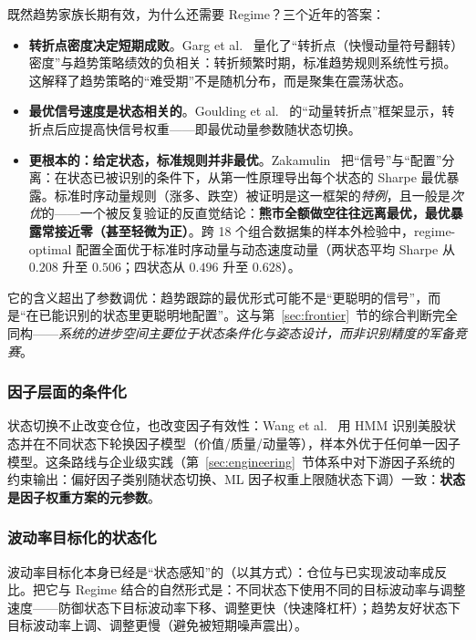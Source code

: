 既然趋势家族长期有效，为什么还需要 Regime？三个近年的答案：

\begin{itemize}[itemsep=2pt]
\item \textbf{转折点密度决定短期成败}。Garg et al.~\cite{garg2024} 量化了“转折点（快慢动量符号翻转）密度”与趋势策略绩效的负相关：转折频繁时期，标准趋势规则系统性亏损。这解释了趋势策略的“难受期”不是随机分布，而是聚集在震荡状态。
\item \textbf{最优信号速度是状态相关的}。Goulding et al.~\cite{goulding2023} 的“动量转折点”框架显示，转折点后应提高快信号权重——即最优动量参数随状态切换。
\item \textbf{更根本的：给定状态，标准规则并非最优}。Zakamulin~\cite{zakamulin2026} 把“信号”与“配置”分离：在状态已被识别的条件下，从第一性原理导出每个状态的 Sharpe 最优暴露。标准时序动量规则（涨多、跌空）被证明是这一框架的\emph{特例}，且一般是\emph{次优}的——一个被反复验证的反直觉结论：\textbf{熊市全额做空往往远离最优，最优暴露常接近零（甚至轻微为正）}。跨 18 个组合数据集的样本外检验中，regime-optimal 配置全面优于标准时序动量与动态速度动量（两状态平均 Sharpe 从 $0.208$ 升至 $0.506$；四状态从 $0.496$ 升至 $0.628$）。
\end{itemize}

\begin{remark}[结论的含义]
它的含义超出了参数调优：趋势跟踪的最优形式可能不是“更聪明的信号”，而是“在已能识别的状态里更聪明地配置”。这与第~\ref{sec:frontier}~节的综合判断完全同构——\emph{系统的进步空间主要位于状态条件化与姿态设计，而非识别精度的军备竞赛}。
\end{remark}

\subsubsection{因子层面的条件化}

状态切换不止改变仓位，也改变因子有效性：Wang et al.~\cite{wang2020} 用 HMM 识别美股状态并在不同状态下轮换因子模型（价值/质量/动量等），样本外优于任何单一因子模型。这条路线与企业级实践（第~\ref{sec:engineering}~节体系中对下游因子系统的约束输出：偏好因子类别随状态切换、ML 因子权重上限随状态下调）一致：\textbf{状态是因子权重方案的元参数}。

\subsubsection{波动率目标化的状态化}

波动率目标化本身已经是“状态感知”的（以其方式）：仓位与已实现波动率成反比。把它与 Regime 结合的自然形式是：不同状态下使用不同的目标波动率与调整速度——防御状态下目标波动率下移、调整更快（快速降杠杆）；趋势友好状态下目标波动率上调、调整更慢（避免被短期噪声震出）。

